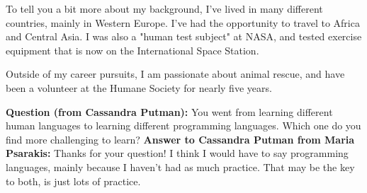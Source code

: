 To tell you a bit more about my background, I've lived in many different countries, mainly in Western Europe. I've had the opportunity to travel to Africa and Central Asia. I was also a "human test subject" at NASA, and tested exercise equipment that is now on the International Space Station.

Outside of my career pursuits, I am passionate about animal rescue, and have been a volunteer at the Humane Society for nearly five years.

\textbf{Question (from Cassandra Putman):} You went from learning different human languages to learning different programming languages.  Which one do you find more challenging to learn?
\textbf{Answer to Cassandra Putman from Maria Psarakis:} Thanks for your question! I think I would have to say programming languages, mainly because I haven't had as much practice. That may be the key to both, is just lots of practice.